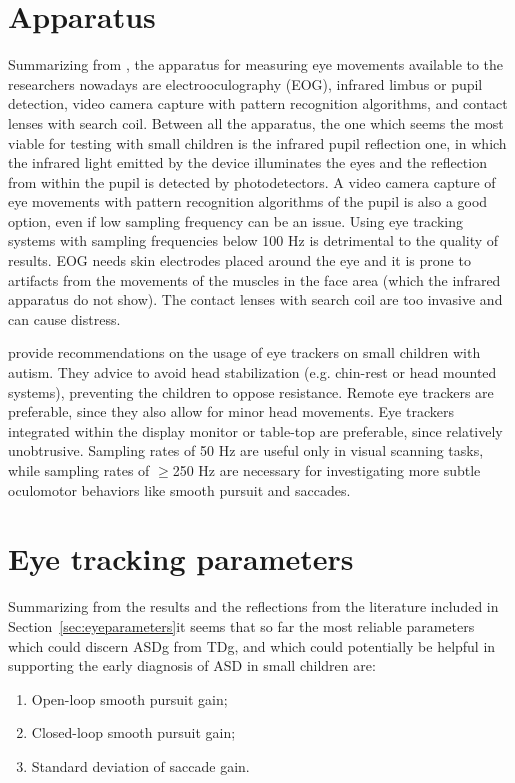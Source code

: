 \section{Apparatus}
\label{sec:fwkapparatus}

Summarizing from \cite{smyrnis2008guidelines}, the apparatus for measuring eye movements available to the researchers nowadays are electrooculography (EOG), infrared limbus or pupil detection, video camera capture with pattern recognition algorithms, and contact lenses with search coil.
Between all the apparatus, the one which seems the most viable for testing with small children is the infrared pupil reflection one, in which the infrared light emitted by the device illuminates the eyes and the reflection from within the pupil is detected by photodetectors. A video camera capture of eye movements with pattern recognition algorithms of the pupil is also a good option, even if low sampling frequency can be an issue. Using eye tracking systems with sampling frequencies below 100 Hz is detrimental to the quality of results.
EOG needs skin electrodes placed around the eye and it is prone to artifacts from the movements of the muscles in the face area (which the infrared apparatus do not show). The contact lenses with search coil are too invasive and can cause distress.

\cite{sasson2012children} provide recommendations on the usage of eye trackers on small children with autism. They advice to avoid head stabilization (e.g. chin-rest or head mounted systems), preventing the children to oppose resistance. Remote eye trackers are preferable, since they also allow for minor head movements. Eye trackers integrated within the display monitor or table-top are preferable, since relatively unobtrusive. Sampling rates of 50 Hz are useful only in visual scanning tasks, while sampling rates of \(\geq\)250 Hz are necessary for investigating more subtle oculomotor behaviors like smooth pursuit and saccades. 

\section{Eye tracking parameters}
\label{sec:fwkparameters}

Summarizing from the results and the reflections from the literature included in Section~\ref{sec:eyeparameters}it seems that so far the most reliable parameters which could discern ASDg from TDg, and which could potentially be helpful in supporting the early diagnosis of ASD in small children are:
\begin{enumerate}
    \item Open-loop smooth pursuit gain;
    \item Closed-loop smooth pursuit gain;
    \item Standard deviation of saccade gain.
\end{enumerate}


